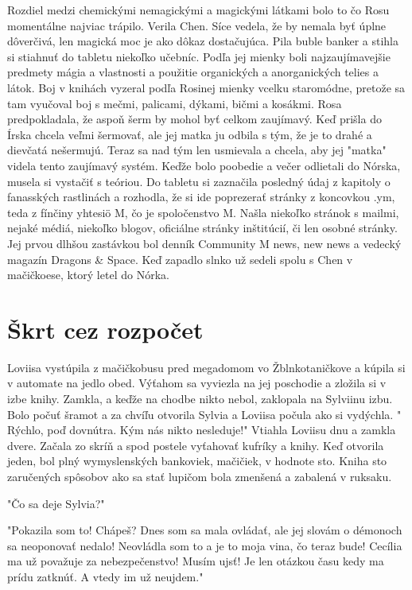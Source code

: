 \documentclass{book}
\begin{document}
Rozdiel medzi chemickými nemagickými a magickými látkami bolo to čo Rosu momentálne najviac trápilo. Verila Chen. Síce vedela, že by nemala byť úplne dôverčivá, len magická moc je ako dôkaz dostačujúca. Pila buble banker a stihla si stiahnuť do tabletu niekoľko učebníc. Podľa jej mienky boli najzaujímavejšie predmety mágia a vlastnosti a použitie organických a anorganických telies a látok. Boj v knihách vyzeral podľa Rosinej mienky vcelku staromódne, pretože sa tam vyučoval boj s mečmi, palicami, dýkami, bičmi a kosákmi. Rosa predpokladala, že aspoň šerm by mohol byť celkom zaujímavý. Keď prišla do Írska chcela veľmi šermovať, ale jej matka ju odbila s tým, že je to drahé a dievčatá nešermujú. Teraz sa nad tým len usmievala a chcela, aby jej "$ $matka"$ $ videla tento zaujímavý systém. Keďže bolo poobedie a večer odlietali do Nórska, musela si vystačiť s teóriou. Do tabletu si zaznačila posledný údaj z kapitoly o fanasských rastlinách a rozhodla, že si ide poprezerať stránky z koncovkou .ym, teda z fínčiny yhtesiö M, čo je spoločenstvo M. Našla niekoľko stránok s mailmi, nejaké médiá, niekoľko blogov, oficiálne stránky inštitúcií, či len osobné stránky. Jej prvou dlhšou zastávkou bol denník Community M news, new news a vedecký magazín Dragons \& Space. Keď zapadlo slnko už sedeli spolu s Chen v mačičkoese, ktorý letel do Nórka.

\chapter{Škrt cez rozpočet}

Loviisa vystúpila z mačičkobusu pred megadomom vo Žblnkotaničkove a kúpila si v automate na jedlo obed. Výťahom sa vyviezla na jej poschodie a zložila si v izbe knihy. Zamkla, a keďže na chodbe nikto nebol, zaklopala na Sylviinu izbu. Bolo počuť šramot a za chvíľu otvorila Sylvia a Loviisa počula ako si vydýchla. "$ $Rýchlo, poď dovnútra. Kým nás nikto nesleduje!"$ $  Vtiahla Loviisu dnu a zamkla dvere. Začala zo skríň a spod postele vyťahovať kufríky a knihy. Keď otvorila jeden, bol plný wymyslenských bankoviek, mačičiek, v hodnote sto. Kniha sto zaručených spôsobov ako sa stať lupičom bola zmenšená a zabalená v ruksaku.

"$ $Čo sa deje Sylvia?"$ $ 

"$ $Pokazila som to! Chápeš? Dnes som sa mala ovládať, ale jej slovám o démonoch sa neoponovať nedalo! Neovládla som to a je to moja vina, čo teraz bude! Cecília ma už považuje za nebezpečenstvo! Musím ujsť! Je len otázkou času kedy ma prídu zatknúť. A vtedy im už neujdem."$ $ 
\end{document}
